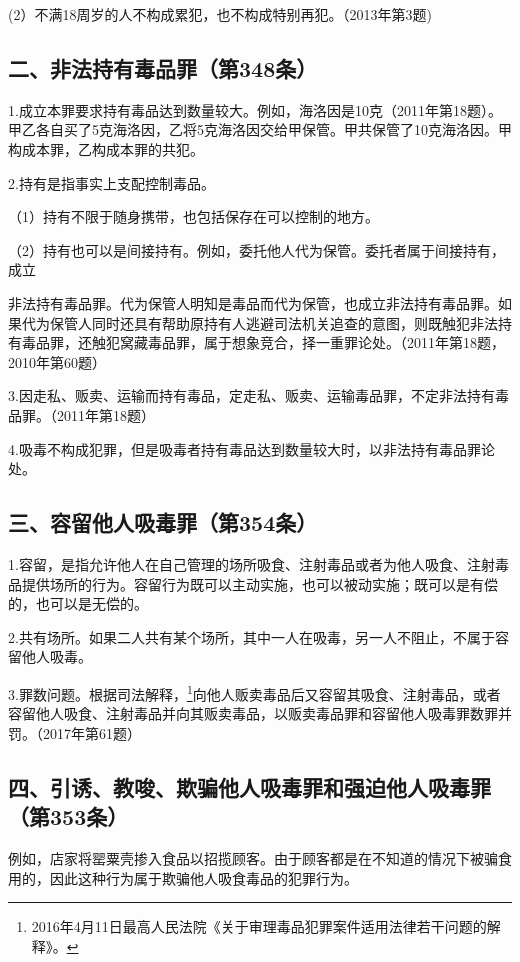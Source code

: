 (2）不满18周岁的人不构成累犯，也不构成特别再犯。（2013年第3题)

\subsection*{二、非法持有毒品罪（第348条）}

1.成立本罪要求持有毒品达到数量较大。例如，海洛因是10克（2011年第18题）。甲乙各自买了5克海洛因，乙将5克海洛因交给甲保管。甲共保管了10克海洛因。甲构成本罪，乙构成本罪的共犯。

2.持有是指事实上支配控制毒品。

（1）持有不限于随身携带，也包括保存在可以控制的地方。

（2）持有也可以是间接持有。例如，委托他人代为保管。委托者属于间接持有，成立

非法持有毒品罪。代为保管人明知是毒品而代为保管，也成立非法持有毒品罪。如果代为保管人同时还具有帮助原持有人逃避司法机关追查的意图，则既触犯非法持有毒品罪，还触犯窝藏毒品罪，属于想象竞合，择一重罪论处。（2011年第18题，2010年第60题）

3.因走私、贩卖、运输而持有毒品，定走私、贩卖、运输毒品罪，不定非法持有毒品罪。（2011年第18题）

4.吸毒不构成犯罪，但是吸毒者持有毒品达到数量较大时，以非法持有毒品罪论处。

\subsection*{三、容留他人吸毒罪（第354条）}

1.容留，是指允许他人在自己管理的场所吸食、注射毒品或者为他人吸食、注射毒品提供场所的行为。容留行为既可以主动实施，也可以被动实施；既可以是有偿的，也可以是无偿的。

2.共有场所。如果二人共有某个场所，其中一人在吸毒，另一人不阻止，不属于容留他人吸毒。

3.罪数问题。根据司法解释，\footnote{2016年4月11日最高人民法院《关于审理毒品犯罪案件适用法律若干问题的解释》。}向他人贩卖毒品后又容留其吸食、注射毒品，或者容留他人吸食、注射毒品并向其贩卖毒品，以贩卖毒品罪和容留他人吸毒罪数罪并罚。（2017年第61题）

\subsection*{四、引诱、教唆、欺骗他人吸毒罪和强迫他人吸毒罪（第353条）}

例如，店家将罂粟壳掺入食品以招揽顾客。由于顾客都是在不知道的情况下被骗食用的，因此这种行为属于欺骗他人吸食毒品的犯罪行为。

